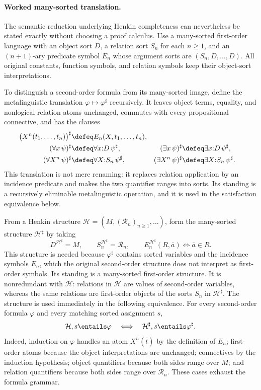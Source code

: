 \paragraph{Worked many-sorted translation.}
The semantic reduction underlying Henkin completeness can nevertheless be
stated exactly without choosing a proof calculus.  Use a many-sorted
first-order language with an object sort \(D\), a relation sort \(S_n\) for
each \(n\geq1\), and an \((n+1)\)-ary predicate symbol \(E_n\) whose argument
sorts are \((S_n,D,\ldots,D)\).  All original constants, function symbols, and
relation symbols keep their object-sort interpretations.

To distinguish a second-order formula from its many-sorted image, define the
metalinguistic translation \(\varphi\mapsto\varphi^\sharp\) recursively.  It
leaves object terms, equality, and nonlogical relation atoms unchanged,
commutes with every propositional connective, and has the clauses
\[
\begin{aligned}
  \bigl(X^n(t_1,\ldots,t_n)\bigr)^\sharp
    &\defeq E_n(X,t_1,\ldots,t_n),\\
  (\forall x\,\psi)^\sharp
    &\defeq\forall x{:}D\,\psi^\sharp,
  & (\exists x\,\psi)^\sharp
    &\defeq\exists x{:}D\,\psi^\sharp,\\
  (\forall X^n\,\psi)^\sharp
    &\defeq\forall X{:}S_n\,\psi^\sharp,
  & (\exists X^n\,\psi)^\sharp
    &\defeq\exists X{:}S_n\,\psi^\sharp.
\end{aligned}
\]
This translation is not mere renaming: it replaces relation application by an
incidence predicate and makes the two quantifier ranges into sorts.  Its
standing is a recursively eliminable metalinguistic operation, and it is used
in the satisfaction equivalence below.

From a Henkin structure
\(\mathcal H=(M,(\mathcal R_n)_{n\geq1},\ldots)\), form the many-sorted
structure \(\mathcal H^\sharp\) by taking
\[
  D^{\mathcal H^\sharp}=M,
  \qquad
  S_n^{\mathcal H^\sharp}=\mathcal R_n,
  \qquad
  E_n^{\mathcal H^\sharp}(R,\bar a)
  \Longleftrightarrow \bar a\in R.
\]
This structure is needed because \(\varphi^\sharp\) contains sorted variables
and the incidence symbols \(E_n\), which the original second-order structure
does not interpret as first-order symbols.  Its standing is a many-sorted
first-order structure.  It is nonredundant with \(\mathcal H\): relations in
\(\mathcal H\) are values of second-order variables, whereas the same
relations are first-order objects of the sorts \(S_n\) in
\(\mathcal H^\sharp\).  The structure is used immediately in the following
equivalence.
For every second-order formula \(\varphi\) and every matching sorted assignment
\(s\),
\[
  \mathcal H,s\entails\varphi
  \quad\Longleftrightarrow\quad
  \mathcal H^\sharp,s\entails\varphi^\sharp.
\]
Indeed, induction on \(\varphi\) handles an atom \(X^n(\bar t)\) by the
definition of \(E_n\); first-order atoms because the object interpretations are
unchanged; connectives by the induction hypothesis; object quantifiers because
both sides range over \(M\); and relation quantifiers because both sides range
over \(\mathcal R_n\).  These cases exhaust the formula grammar.

